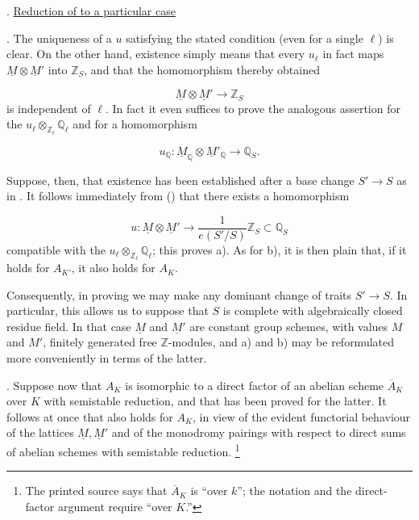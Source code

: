 
\medskip
\noindent
{}. \underline{Reduction of  to a particular case}

\smallskip
\noindent
{}. The uniqueness of a $u$ satisfying the stated condition (even
for a single $\ell$) is clear. On the other hand, existence simply means
that every $u_\ell$ in fact maps $\underline M\otimes\underline M'$ into
$\mathbb Z_S$, and that the homomorphism thereby obtained

\begin{equation*}
\underline M\otimes\underline M'\longrightarrow\mathbb Z_S
\end{equation*}
is independent of $\ell$. In fact it even suffices to prove the analogous
assertion for the $u_\ell\otimes_{\mathbb Z_\ell}\mathbb Q_\ell$ and for
a homomorphism

\begin{equation*}
u_{\mathbb Q}:\underline M_{\mathbb Q}\otimes
 \underline M'_{\mathbb Q}\longrightarrow\mathbb Q_S.
\end{equation*}

Suppose, then, that existence has been established after a base change
$S'\longrightarrow S$ as in . It follows immediately from ()
that there exists a homomorphism

\begin{equation*}
u:\underline M\otimes\underline M'
 \longrightarrow\frac{1}{e(S'/S)}\mathbb Z_S\subset\mathbb Q_S
\end{equation*}
compatible with the $u_\ell\otimes_{\mathbb Z_\ell}\mathbb Q_\ell$;
this proves a). As for b), it is then plain that, if it holds for
$A_{K'}$, it also holds for $A_K$.

Consequently, in proving  we may make any dominant change of traits
$S'\longrightarrow S$. In particular, this allows us to suppose that
$S$ is complete with algebraically closed residue field. In that case
$\underline M$ and $\underline M'$ are constant group schemes, with
values $M$ and $M'$, finitely generated free $\mathbb Z$-modules, and a)
and b) may be reformulated more conveniently in terms of the latter.

\smallskip
\noindent
{}. Suppose now that $A_K$ is isomorphic to a direct factor of an
abelian scheme $\overline A_K$ over $K$ with semistable reduction, and
that  has been proved for the latter. It follows at once that 
also holds for $A_K$, in view of the evident functorial behaviour of the
lattices $\underline M,\underline M'$ and of the monodromy pairings with
respect to direct sums of abelian schemes with semistable reduction.
\footnote{The printed source says that $\overline A_K$ is ``over $k$'';
the notation and the direct-factor argument require ``over $K$.''}

